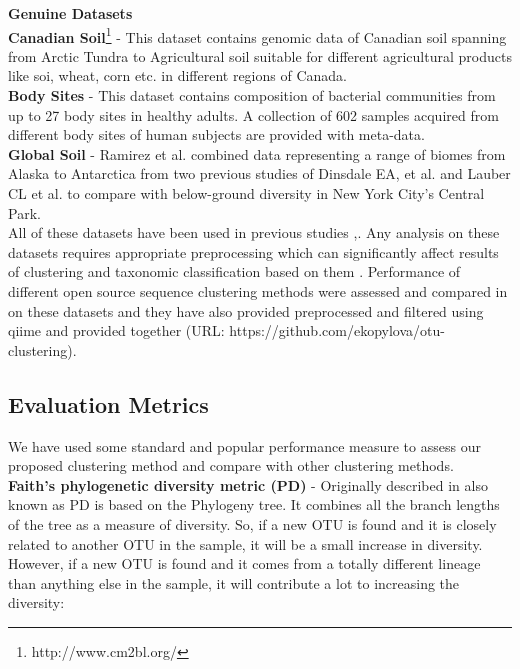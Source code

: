 \documentclass[10pt, conference, compsocconf]{IEEEtran}
\begin{document}
\textbf{Genuine Datasets}\\
\hspace*{4mm}\textbf{Canadian Soil}\footnote{http://www.cm2bl.org/} - This dataset contains genomic data of Canadian soil spanning from Arctic Tundra to Agricultural soil suitable for different agricultural products like soi, wheat, corn etc. in different regions of Canada.\\
\hspace*{4mm}\textbf{Body Sites} - This dataset contains composition of bacterial communities from up to 27 body sites in healthy adults. A collection of 602 samples acquired from different body sites of human subjects are provided with meta-data.\\
\hspace*{4mm}\textbf{Global Soil} - Ramirez et al.\cite{MARglobalSoil} combined data representing a range of biomes from Alaska to Antarctica from two previous studies of Dinsdale EA, et al.\cite{MARnineBiomes} and Lauber CL et al.\cite{MARrestOfGlobalSoil} to compare with below-ground diversity in New York City's Central Park.\\

All of these datasets have been used in previous studies \cite{MARmockDatasetRef},\cite{MARopenDeNovo}. Any analysis on these datasets requires appropriate preprocessing which can significantly affect results of clustering and taxonomic classification based on them \cite{MARmockDatasetRef}. Performance of different open source sequence clustering methods were assessed and compared in \cite{MARopenDeNovo} on these datasets and they have also provided preprocessed and filtered using qiime and provided together (URL: https://github.com/ekopylova/otu-clustering).         
    

\subsection{Evaluation Metrics}
We have used some standard and popular performance measure to assess our proposed clustering method and compare with other clustering methods.\\ 
\hspace*{4mm}\textbf{Faith’s phylogenetic diversity metric (PD)} - Originally described in \cite{MARfaith1992conservation} also known as PD  is based on the Phylogeny tree. It combines all the branch lengths of the tree as a measure of diversity. So, if a new OTU is found and it is closely related to another OTU in the sample, it will be a small increase in diversity. However, if a new OTU is found and it comes from a totally different lineage than anything else in the sample, it will contribute a lot to increasing the diversity:
\end{document}
